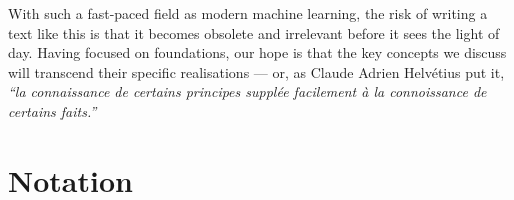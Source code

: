 \documentclass[11pt]{book}              %
\makeatletter
\renewcommand{\thesection}{%
  \ifnum\c@chapter<1 \@arabic\c@section
  \else \thechapter.\@arabic\c@section
  \fi
}
\renewcommand*{\sectionmark}[1]{ \markright{\thesection\ ##1} }%
\makeatother
\begin{document}
With such a fast-paced field as modern machine learning, the risk of writing a text like this is that it becomes obsolete and irrelevant before it sees the light of day. Having focused on foundations, our hope is that the key concepts we discuss will transcend their specific realisations --- or, as Claude Adrien Helvétius put it, {\em ``la connaissance de certains principes supplée facilement à la connoissance de certains faits.'' }

%

\section*{Notation}
\sectionmark{Notation}
\end{document}
